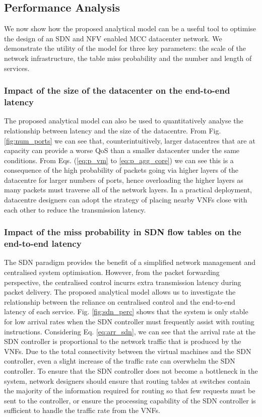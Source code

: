 \subsection{Performance Analysis}
We now show how the proposed analytical model can be a useful tool to optimise the design of an SDN and NFV enabled MCC datacenter network. We demonstrate the utility of the model for three key parameters: the scale of the network infrastructure, the table miss probability and the number and length of services.

\subsubsection{Impact of the size of the datacenter on the end-to-end latency}
The proposed analytical model can also be used to quantitatively analyse the relationship between latency and the size of the datacentre. From Fig. \ref{fig:num_ports} we can see that, counterintuitively, larger datacentres that are at capacity can provide a worse QoS than a smaller datacenter under the same conditions. From Eqs. (\ref{eq:p_vm} to \ref{eq:p_agg_core}) we can see this is a consequence of the high probability of packets going via higher layers of the datacentre for larger numbers of ports, hence overloading the higher layers as many packets must traverse all of the network layers. In a practical deployment, datacentre designers can adopt the strategy of placing nearby VNFs close with each other to reduce the transmission latency.

\subsubsection{Impact of the miss probability in SDN flow tables on the end-to-end latency}
The SDN paradigm provides the benefit of a simplified network management and centralised system optimisation. However, from the packet forwarding perspective, the centralised control incurrs extra transmission latency during packet delivery. The proposed analytical model allows us to investigate the relationship between the reliance on centralised control and the end-to-end latency of each service. Fig. \ref{fig:sdn_perc} shows that the system is only stable for low arrival rates when the SDN controller must frequently assist with routing instructions. Considering Eq. \ref{eq:arr_sdn}, we can see that the arrival rate at the SDN controller is proportional to the network traffic that is produced by the VNFs. Due to the total connectivity between the virtual machines and the SDN controller, even a slight increase of the traffic rate can overwhelm the SDN controller. To ensure that the SDN controller does not become a bottleneck in the system, network designers should ensure that routing tables at switches contain the majority of the information required for routing so that few requests must be sent to the controller, or ensure the processing capability of the SDN controller is sufficient to handle the traffic rate from the VNFs.

